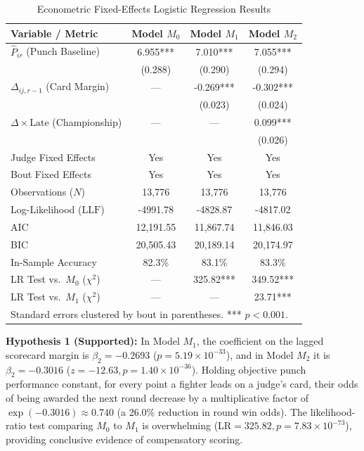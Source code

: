 \documentclass[conference]{IEEEtran}
\begin{document}
\begin{table}[t]
\caption{Econometric Fixed-Effects Logistic Regression Results}
\label{tab:econometrics}
\centering
\footnotesize
\setlength{\tabcolsep}{3.5pt}
\begin{tabular}{lccc}
\toprule
\textbf{Variable / Metric} & \textbf{Model $M_0$} & \textbf{Model $M_1$} & \textbf{Model $M_2$} \\
\midrule
$\hat{P}_{ir}$ (Punch Baseline) & 6.955*** & 7.010*** & 7.055*** \\
 & (0.288) & (0.290) & (0.294) \\
$\Delta_{ij,r-1}$ (Card Margin) & --- & -0.269*** & -0.302*** \\
 & & (0.023) & (0.024) \\
$\Delta \times \text{Late}$ (Championship) & --- & --- & 0.099*** \\
 & & & (0.026) \\
\midrule
Judge Fixed Effects & Yes & Yes & Yes \\
Bout Fixed Effects & Yes & Yes & Yes \\
Observations ($N$) & 13,776 & 13,776 & 13,776 \\
Log-Likelihood ($\text{LLF}$) & -4991.78 & -4828.87 & -4817.02 \\
AIC & 12,191.55 & 11,867.74 & 11,846.03 \\
BIC & 20,505.43 & 20,189.14 & 20,174.97 \\
In-Sample Accuracy & 82.3\% & 83.1\% & 83.3\% \\
\midrule
LR Test vs.\ $M_0$ ($\chi^2$) & --- & 325.82*** & 349.52*** \\
LR Test vs.\ $M_1$ ($\chi^2$) & --- & --- & 23.71*** \\
\bottomrule
\multicolumn{4}{l}{\scriptsize Standard errors clustered by bout in parentheses. *** $p < 0.001$.}
\end{tabular}
\end{table}

\textbf{Hypothesis 1 (Supported):} In Model $M_1$, the coefficient on the lagged scorecard margin is $\beta_2 = -0.2693$ ($p = 5.19 \times 10^{-33}$), and in Model $M_2$ it is $\beta_2 = -0.3016$ ($z = -12.63, p = 1.40 \times 10^{-36}$). Holding objective punch performance constant, for every point a fighter leads on a judge's card, their odds of being awarded the next round decrease by a multiplicative factor of $\exp(-0.3016) \approx 0.740$ (a 26.0\% reduction in round win odds). The likelihood-ratio test comparing $M_0$ to $M_1$ is overwhelming ($\text{LR} = 325.82, p = 7.83 \times 10^{-73}$), providing conclusive evidence of compensatory scoring.
\end{document}

